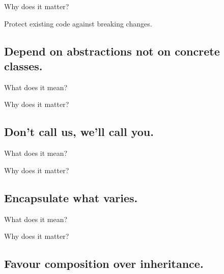 \documentclass{beamer}
\begin{document}
\begin{frame}{Why does it matter?}
    \par Protect existing code against breaking changes.
\end{frame}

\begin{frame}{}
    
\end{frame}

\begin{frame}{}
    
\end{frame}

\subsection{Depend on abstractions not on concrete classes.}

\begin{frame}{What does it mean?}
\end{frame}

\begin{frame}{Why does it matter?}
\end{frame}

\subsection{Don't call us, we'll call you.}

\begin{frame}{What does it mean?}
\end{frame}

\begin{frame}{Why does it matter?}
\end{frame}

\subsection{Encapsulate what varies.}

\begin{frame}{What does it mean?}
\end{frame}

\begin{frame}{Why does it matter?}
\end{frame}

\subsection{Favour composition over inheritance.}
\end{document}
